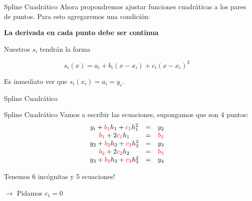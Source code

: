 \documentclass[xcolor=svgnames]{beamer} %
\theoremstyle{plain}
\renewcommand{\textbf}[1]{{\bfseries\textcolor{redUnq2}{#1}}}
\theoremstyle{definition}
\begin{document}
\begin{frame}{Spline Cuadrático}
Ahora propondremos ajustar funciones cuadráticas a los pares de puntos. Para esto agregaremos una condición:\vspace{15pt}\pause

\textbf{La derivada en cada punto debe ser continua}\vspace{15pt} \pause

Nuestros $s_i$ tendrán la forma

$$ s_i(x) = a_i +b_i(x-x_i) + c_i(x-x_i)^2$$ \pause

Es inmediato ver que $s_i(x_i) = a_i = y_i$.

\end{frame}


\begin{frame}{Spline Cuadrático}
  
\end{frame}

\begin{frame}{Spline Cuadrático}
  Vamos a escribir las ecuaciones, supongamos que son 4 puntos:\pause
  $$\begin{array}{ccc}
    y_i +{\color{red}b_1} h_1 + {\color{red}c_1} h_1^2 &=& y_2 \\
    {\color{red}b_1} + 2{\color{red}c_1} h_1 &=& {\color{red}b_2} \\
    y_2 + {\color{red}b_2} h_2 + {\color{red}c_2} h_2^2 &=& y_3 \\
    {\color{red}b_2} + 2{\color{red}c_2} h_2 &=& {\color{red}b_3} \\
    y_3 + {\color{red}b_3} h_3 + {\color{red}c_3} h_3^2 &=& y_4 \\
  \end{array}$$\pause
  \begin{minipage}{.45\linewidth}
	  \begin{tcolorbox}
	     Tenemos 6 incógnitas y 5 ecuaciones!
  	  \end{tcolorbox}  
  \end{minipage}\pause \hspace{15pt}$\rightarrow$\hspace{15pt}  Pidamos $c_1=0$

\end{frame}
\end{document}
